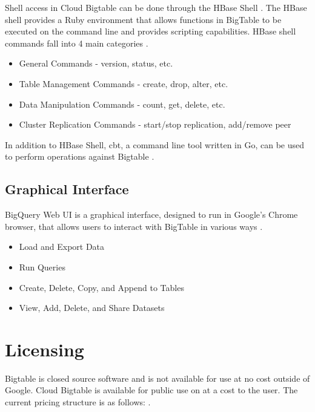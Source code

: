 \documentclass[9pt,twocolumn,twoside]{styles/osajnl}
\begin{document}
Shell access in Cloud Bigtable can be done through the HBase Shell \cite{www-hbaseshell}. The HBase shell provides a Ruby environment that allows functions in BigTable to be executed on the command line and provides scripting capabilities. HBase shell commands fall into 4 main categories \cite{www-hbaseshell2}.

\vspace{-\topsep}
\begin{itemize}
\item General Commands - version, status, etc.
\item Table Management Commands - create, drop, alter, etc.
\item Data Manipulation Commands - count, get, delete, etc.
\item Cluster Replication Commands - start/stop replication, add/remove peer 
\end{itemize}
\vspace{-\topsep}

In addition to HBase Shell, cbt, a command line tool written in Go, can be used to perform operations against Bigtable \cite{www-cbt}. 


\subsection{Graphical Interface}

BigQuery Web UI is a graphical interface, designed to run in Google's Chrome browser, that allows users to interact with BigTable in various ways \cite{www-bigquerywebui}.

\vspace{-\topsep}
\begin{itemize}
\item Load and Export Data
\item Run Queries
\item Create, Delete, Copy, and Append to Tables 
\item View, Add, Delete, and Share Datasets 
\end{itemize}
\vspace{-\topsep}


\section{Licensing}

Bigtable is closed source software and is not available for use at no cost outside of Google. Cloud Bigtable is available for public use on at a cost to the user. The current pricing structure is as follows: \cite{www-cloudbigtable}.
\end{document}
